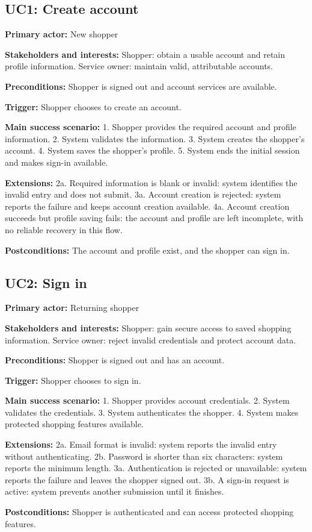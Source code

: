 \newcommand{\ucfield}[2]{\noindent\textbf{#1:} #2\par}

\subsection{UC1: Create account}
\ucfield{Primary actor}{New shopper}
\ucfield{Stakeholders and interests}{Shopper: obtain a usable account and retain profile information. Service owner: maintain valid, attributable accounts.}
\ucfield{Preconditions}{Shopper is signed out and account services are available.}
\ucfield{Trigger}{Shopper chooses to create an account.}
\ucfield{Main success scenario}{1. Shopper provides the required account and profile information. 2. System validates the information. 3. System creates the shopper's account. 4. System saves the shopper's profile. 5. System ends the initial session and makes sign-in available.}
\ucfield{Extensions}{2a. Required information is blank or invalid: system identifies the invalid entry and does not submit. 3a. Account creation is rejected: system reports the failure and keeps account creation available. 4a. Account creation succeeds but profile saving fails: the account and profile are left incomplete, with no reliable recovery in this flow.}
\ucfield{Postconditions}{The account and profile exist, and the shopper can sign in.}

\subsection{UC2: Sign in}
\ucfield{Primary actor}{Returning shopper}
\ucfield{Stakeholders and interests}{Shopper: gain secure access to saved shopping information. Service owner: reject invalid credentials and protect account data.}
\ucfield{Preconditions}{Shopper is signed out and has an account.}
\ucfield{Trigger}{Shopper chooses to sign in.}
\ucfield{Main success scenario}{1. Shopper provides account credentials. 2. System validates the credentials. 3. System authenticates the shopper. 4. System makes protected shopping features available.}
\ucfield{Extensions}{2a. Email format is invalid: system reports the invalid entry without authenticating. 2b. Password is shorter than six characters: system reports the minimum length. 3a. Authentication is rejected or unavailable: system reports the failure and leaves the shopper signed out. 3b. A sign-in request is active: system prevents another submission until it finishes.}
\ucfield{Postconditions}{Shopper is authenticated and can access protected shopping features.}

